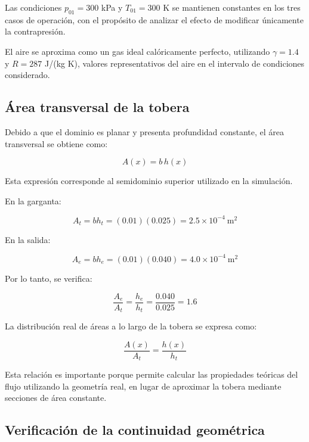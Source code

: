 \documentclass[12pt,letterpaper]{article}
\numberwithin{equation}{section}
\begin{document}
Las condiciones $p_{01}=300$ kPa y
$T_{01}=300$ K se mantienen constantes
en los tres casos de operación, con
el propósito de analizar el efecto
de modificar únicamente la contrapresión.

El aire se aproxima como un gas ideal
calóricamente perfecto, utilizando
$\gamma=1.4$ y $R=287$ J/(kg K),
valores representativos del aire
en el intervalo de condiciones
considerado.

\subsection{Área transversal de la tobera}

Debido a que el dominio es planar
y presenta profundidad constante,
el área transversal se obtiene como:

\begin{equation}
A(x)=b\,h(x)
\label{eq:area_real_tobera}
\end{equation}

Esta expresión corresponde al
semidominio superior utilizado
en la simulación.

En la garganta:

\begin{equation}
A_t=bh_t
=(0.01)(0.025)
=2.5\times10^{-4}\ \mathrm{m^2}
\end{equation}

En la salida:

\begin{equation}
A_e=bh_e
=(0.01)(0.040)
=4.0\times10^{-4}\ \mathrm{m^2}
\end{equation}

Por lo tanto, se verifica:

\begin{equation}
\boxed{
\frac{A_e}{A_t}
=\frac{h_e}{h_t}
=\frac{0.040}{0.025}
=1.6
}
\label{eq:verificacion_relacion_areas}
\end{equation}

La distribución real de áreas
a lo largo de la tobera se expresa como:

\begin{equation}
\boxed{
\frac{A(x)}{A_t}
=\frac{h(x)}{h_t}
}
\label{eq:distribucion_area_real}
\end{equation}

Esta relación es importante porque
permite calcular las propiedades
teóricas del flujo utilizando la
geometría real, en lugar de
aproximar la tobera mediante
secciones de área constante.

\subsection{Verificación de la continuidad geométrica}
\end{document}
